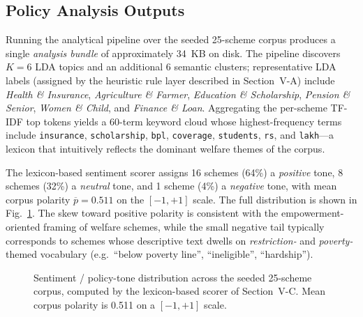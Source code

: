 \documentclass[10pt, journal, twocolumn]{IEEEtran}
\begin{document}
\subsection{Policy Analysis Outputs}
Running the analytical pipeline over the seeded 25-scheme corpus produces a single \emph{analysis bundle} of approximately 34~KB on disk. The pipeline discovers $K=6$ LDA topics and an additional 6 semantic clusters; representative LDA labels (assigned by the heuristic rule layer described in Section~V-A) include \emph{Health \& Insurance}, \emph{Agriculture \& Farmer}, \emph{Education \& Scholarship}, \emph{Pension \& Senior}, \emph{Women \& Child}, and \emph{Finance \& Loan}. Aggregating the per-scheme TF-IDF top tokens yields a 60-term keyword cloud whose highest-frequency terms include \texttt{insurance}, \texttt{scholarship}, \texttt{bpl}, \texttt{coverage}, \texttt{students}, \texttt{rs}, and \texttt{lakh}---a lexicon that intuitively reflects the dominant welfare themes of the corpus.

The lexicon-based sentiment scorer assigns 16 schemes (64\%) a \emph{positive} tone, 8 schemes (32\%) a \emph{neutral} tone, and 1 scheme (4\%) a \emph{negative} tone, with mean corpus polarity $\overline{p}=0.511$ on the $[-1,+1]$ scale. The full distribution is shown in Fig.~\ref{fig:sentiment_pie}. The skew toward positive polarity is consistent with the empowerment-oriented framing of welfare schemes, while the small negative tail typically corresponds to schemes whose descriptive text dwells on \emph{restriction-} and \emph{poverty-}themed vocabulary (e.g.\ ``below poverty line'', ``ineligible'', ``hardship'').

\begin{figure}[htbp]
    \centering
    \caption{Sentiment / policy-tone distribution across the seeded 25-scheme corpus, computed by the lexicon-based scorer of Section~V-C. Mean corpus polarity is 0.511 on a $[-1,+1]$ scale.}
    \label{fig:sentiment_pie}
\end{figure}
\end{document}
